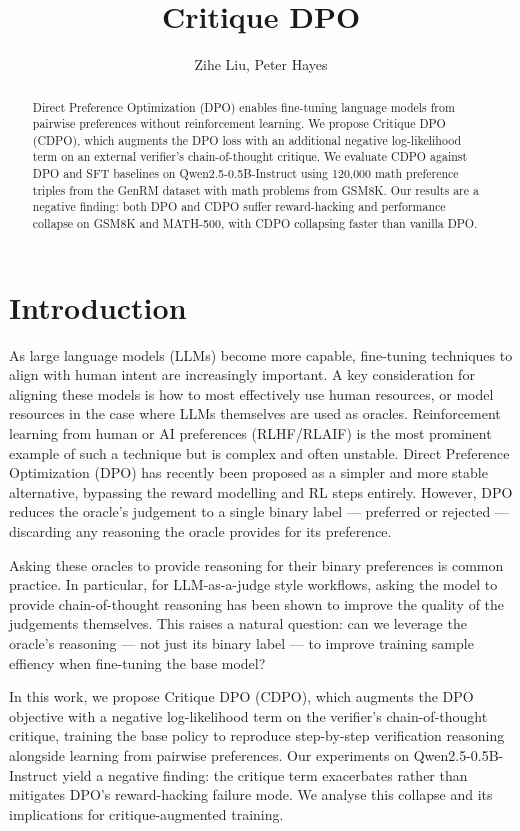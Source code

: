 \documentclass[11pt]{article}
\title{Critique DPO}
\author{Zihe Liu, Peter Hayes}
\begin{document}
\maketitle

\begin{abstract}
    Direct Preference Optimization (DPO) enables fine-tuning language models from pairwise preferences without reinforcement learning. We propose Critique DPO (CDPO), which augments the DPO loss with an additional negative log-likelihood term on an external verifier's chain-of-thought critique. We evaluate CDPO against DPO and SFT baselines on Qwen2.5-0.5B-Instruct using 120{,}000 math preference triples from the GenRM dataset with math problems from GSM8K. Our results are a negative finding: both DPO and CDPO suffer reward-hacking and performance collapse on GSM8K and MATH-500, with CDPO collapsing faster than vanilla DPO.
\end{abstract}


\section{Introduction}

As large language models (LLMs) become more capable, fine-tuning techniques to align with human intent are increasingly important. A key consideration for aligning these models is how to most effectively use human resources, or model resources in the case where LLMs themselves are used as oracles. Reinforcement learning from human or AI preferences (RLHF/RLAIF) is the most prominent example of such a technique but is complex and often unstable. Direct Preference Optimization (DPO) \autocite{rafailov2024directpreferenceoptimizationlanguage} has recently been proposed as a simpler and more stable alternative, bypassing the reward modelling and RL steps entirely. However, DPO reduces the oracle's judgement to a single binary label --- preferred or rejected --- discarding any reasoning the oracle provides for its preference.

Asking these oracles to provide reasoning for their binary preferences is common practice. In particular, for LLM-as-a-judge style workflows, asking the model to provide chain-of-thought reasoning has been shown to improve the quality of the judgements themselves. This raises a natural question: can we leverage the oracle's reasoning --- not just its binary label --- to improve training sample effiency when fine-tuning the base model?

In this work, we propose Critique DPO (CDPO), which augments the DPO objective with a negative log-likelihood term on the verifier's chain-of-thought critique, training the base policy to reproduce step-by-step verification reasoning alongside learning from pairwise preferences. Our experiments on Qwen2.5-0.5B-Instruct yield a negative finding: the critique term exacerbates rather than mitigates DPO's reward-hacking failure mode. We analyse this collapse and its implications for critique-augmented training.
\end{document}
